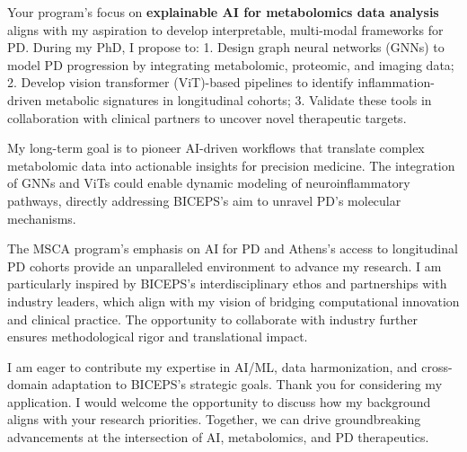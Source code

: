 \documentclass[11pt,a4paper, final]{moderncv}
\begin{document}
Your program's focus on \textbf{explainable AI for metabolomics data analysis} aligns with my aspiration 
to develop interpretable, multi-modal frameworks for PD. 
During my PhD, I propose to: 
1. Design graph neural networks (GNNs) to model PD progression by integrating metabolomic, proteomic, and imaging data; 
2. Develop vision transformer (ViT)-based pipelines to identify inflammation-driven metabolic signatures in longitudinal cohorts; 
3. Validate these tools in collaboration with clinical partners to uncover novel therapeutic targets.

My long-term goal is to pioneer AI-driven workflows that translate complex metabolomic data into actionable insights for precision medicine. 
The integration of GNNs and ViTs could enable dynamic modeling of neuroinflammatory pathways, directly addressing BICEPS's aim to unravel PD's molecular mechanisms.

The MSCA program's emphasis on AI for PD and Athens's access to longitudinal PD cohorts provide an unparalleled environment to advance my research. 
I am particularly inspired by BICEPS's interdisciplinary ethos and partnerships with industry leaders, 
which align with my vision of bridging computational innovation and clinical practice. 
The opportunity to collaborate with industry further ensures methodological rigor and translational impact.

I am eager to contribute my expertise in AI/ML, data harmonization, and cross-domain adaptation to BICEPS's strategic goals. 
Thank you for considering my application. 
I would welcome the opportunity to discuss how my background aligns with your research priorities. 
Together, we can drive groundbreaking advancements at the intersection of AI, metabolomics, and PD therapeutics.

\makeletterclosing
\end{document}
